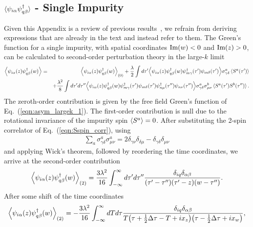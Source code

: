 \documentclass[aps,prb,twocolumn,superscriptaddress]{revtex4-1}
\begin{document}
\begin{widetext}
\section{$\braket{\psi_{i\alpha}\psi_{q\beta}^{\dagger}}$ - Single Impurity} \label{app:asym_singleImp}
Given this Appendix is a review of previous results~\cite{affleck1993exact}, we refrain from deriving expressions that are already in the text and instead refer to them. The Green's function for a single impurity, with spatial coordinates $\textup{Im}(w)<0$ and $\textup{Im}(z)>0$, can be calculated to second-order perturbation theory in the large-$k$ limit
\begin{eqnarray}
\Bigl\langle{\psi_{i\alpha}(z)\psi_{q\beta}^{\dagger}(w)\Bigr\rangle}=&&\Bigl\langle{\psi_{i\alpha}(z)\psi_{q\beta}^{\dagger}(w)\Bigr\rangle}_{(0)}+\frac{\lambda}{2}\int{d\tau'}\Bigl\langle{\psi_{i\alpha}(z)\psi_{q\beta}^{\dagger}(w)\psi_{m\gamma}^{\dagger}(\tau')\psi_{m\delta}(\tau')\Bigr\rangle}\sigma^{a}_{\gamma\delta}\braket{S^{a}(\tau')} \label{eqn:appA_0} \\ 
&&+\frac{\lambda^{2}}{8}\int{d\tau'd\tau''}\Bigl\langle{\psi_{i\alpha}(z)\psi_{q\beta}^{\dagger}(w)\psi_{m\gamma}^{\dagger}(\tau')\psi_{m\delta}(\tau')\psi_{n\mu}^{\dagger}(\tau'')\psi_{n\nu}(\tau'')\Bigr\rangle}\sigma^{a}_{\gamma\delta}\sigma^{b}_{\mu\nu}\braket{S^{a}(\tau')S^{b}(\tau'')}. \nonumber 
\end{eqnarray}
The zeroth-order contribution is given by the free field Green's function of Eq.~(\ref{eqn:asym_largek_1}). The first-order contribution is null due to the rotational invariance of the impurity spin $\braket{S^{a}}=0$. After substituting the 2-spin correlator of Eq.~(\ref{eqn:Sspin_corr}), using
\begin{eqnarray}
 \label{eqn:appB_0}
\sum_a \sigma^{a}_{\gamma\delta}\sigma^{a}_{\mu\nu}=2\delta_{\gamma\nu}\delta_{\delta\mu}-\delta_{\gamma\delta}\delta_{\mu\nu}
\end{eqnarray}
and applying Wick's theorem, followed by reordering the time coordinates, we arrive  at the second-order contribution
\begin{eqnarray}
\Bigl\langle{\psi_{i\alpha}(z)\psi_{q\beta}^{\dagger}(w)\Bigr\rangle}_{(2)}=\frac{3\lambda^{2}}{16}\int_{-\infty}^{\infty}{d\tau'd\tau''}\frac{\delta_{iq}\delta_{\alpha\beta}}{(\tau'-\tau'')(\tau'-z)(w-\tau'')}.  
\end{eqnarray}
After some shift of the time coordinates 
\begin{eqnarray}
\Bigl\langle{\psi_{i\alpha}(z)\psi_{q\beta}^{\dagger}(w)\Bigr\rangle}_{(2)}=-\frac{3\lambda^{2}}{16}\int_{-\infty}^{\infty}{dTd\tau}\frac{\delta_{iq}\delta_{\alpha\beta}}{T\bigl(\tau+\frac{1}{2}\Delta\tau-T+ix_{z}\bigr)\bigl(\tau-\frac{1}{2}\Delta\tau+ix_{w}\bigr)}, \label{eqn:appA_1} 

\end{eqnarray}
\end{widetext}
\end{document}
